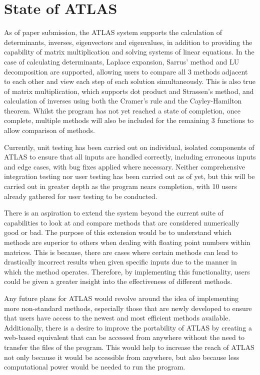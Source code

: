 \documentclass[natbib]{llncs}
\begin{document}
\section{State of ATLAS}
As of paper submission, the ATLAS system supports the calculation of determinants, inverses, eigenvectors and eigenvalues, in addition to providing the capability of matrix multiplication and solving systems of linear equations. In the case of calculating determinants, Laplace expansion, Sarrus' method and LU decomposition are supported, allowing users to compare all 3 methods adjacent to each other and view each step of each solution simultaneously. This is also true of matrix multiplication, which supports dot product and Strassen's method, and calculation of inverses using both the Cramer's rule and the Cayley-Hamilton theorem. Whilst the program has not yet reached a state of completion, once complete, multiple methods will also be included for the remaining 3 functions to allow comparison of methods.

Currently, unit testing has been carried out on individual, isolated components of ATLAS to ensure that all inputs are handled correctly, including erroneous inputs and edge cases, with bug fixes applied where necessary. Neither comprehensive integration testing nor user testing has been carried out as of yet, but this will be carried out in greater depth as the program nears completion, with 10 users already gathered for user testing to be conducted.

There is an aspiration to extend the system beyond the current suite of capabilities to look at and compare methods that are considered numerically good or bad. The purpose of this extension would be to understand which methods are superior to others when dealing with floating point numbers within matrices. This is because, there are cases where certain methods can lead to drastically incorrect results when given specific inputs due to the manner in which the method operates. Therefore, by implementing this functionality, users could be given a greater insight into the effectiveness of different methods.

Any future plans for ATLAS would revolve around the idea of implementing more non-standard methods, especially those that are newly developed to ensure that users have access to the newest and most efficient methods available. Additionally, there is a desire to improve the portability of ATLAS by creating a web-based equivalent that can be accessed from anywhere without the need to transfer the files of the program. This would help to increase the reach of ATLAS not only because it would be accessible from anywhere, but also because less computational power would be needed to run the program.
\end{document}
